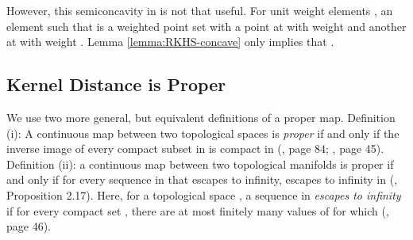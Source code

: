 \documentclass[11pt]{myclass}
\begin{document}
However, this semiconcavity in  is not that useful. 
For unit weight elements , an element  such that  is a weighted point set with a point at  with weight  and another at  with weight . 
Lemma \ref{lemma:RKHS-concave} only implies that 
.  


\subsection{Kernel Distance is Proper}

We use two more general, but equivalent definitions of a proper map.  
Definition (i): A continuous map  between two topological spaces is \emph{proper} if and only if the inverse image of every compact subset in  is compact in  (\cite{Lee2000}, page 84; \cite{Lee2003}, page 45). 
Definition (ii): a continuous map  between two topological manifolds is proper if and only if for every sequence  in  that escapes to infinity,  escapes to infinity in  (\cite{Lee2003}, Proposition 2.17).
Here, for a topological space , a sequence  in  \emph{escapes to infinity} if for every compact set , there are at most finitely many values of  for which  (\cite{Lee2003}, page 46). 
\end{document}
